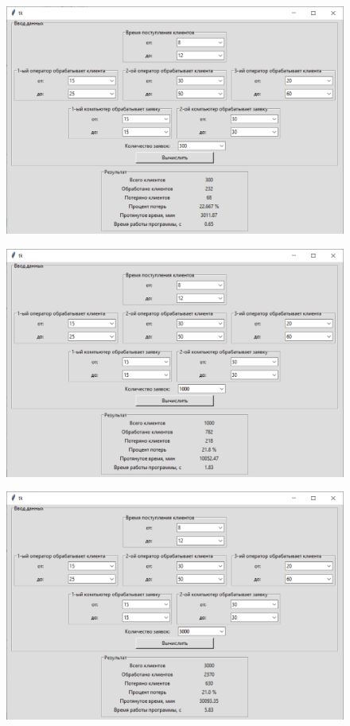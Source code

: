 \documentclass[12pt,a4paper,oneside]{report}
\begin{document}
\begin{figure}[!h]
	\centering
	\includegraphics[scale=0.7]{2.png}
	\label{fig:screenshot004}
\end{figure}

\begin{figure}[!h]
	\centering
	\includegraphics[scale=0.7]{3.png}
	\label{fig:screenshot005}
\end{figure}

\begin{figure}[!h]
	\centering
	\includegraphics[scale=0.7]{4.png}
	\label{fig:screenshot006}
\end{figure}
\end{document}

